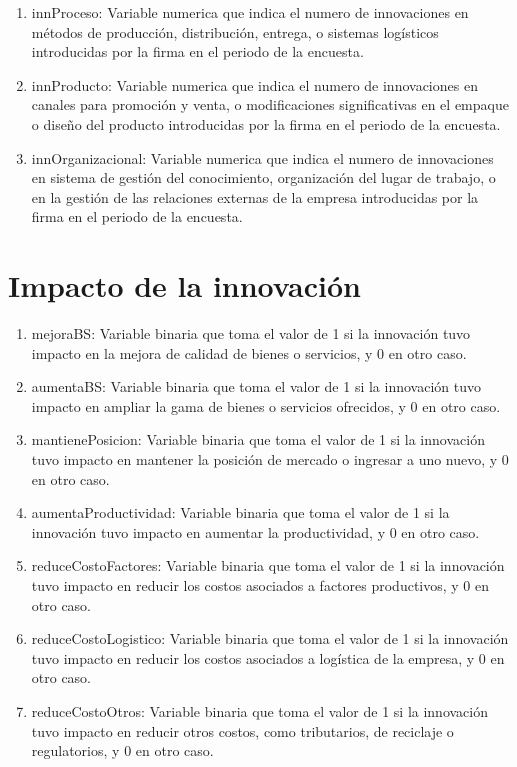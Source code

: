 \documentclass[12pt,a4paper]{article}
\begin{document}
\begin{enumerate}
	\item innProceso: Variable numerica que indica el numero de innovaciones en métodos de producción, distribución, entrega, o sistemas logísticos introducidas por la firma en el periodo de la encuesta.
	\item innProducto: Variable numerica que indica el numero de innovaciones en canales para promoción y venta, o modificaciones significativas en el empaque o diseño del producto introducidas por la firma en el periodo de la encuesta.
	\item innOrganizacional: Variable numerica que indica el numero de innovaciones en sistema de gestión del conocimiento, organización del lugar de trabajo, o en la gestión de las relaciones externas de la empresa introducidas por la firma en el periodo de la encuesta.
\end{enumerate}

\section{Impacto de la innovación}

\begin{enumerate}
	\item mejoraBS: Variable binaria que toma el valor de 1 si la innovación tuvo impacto en la mejora de calidad de bienes o servicios, y 0 en otro caso.
	\item aumentaBS: Variable binaria que toma el valor de 1 si la innovación tuvo impacto en ampliar la gama de bienes o servicios ofrecidos, y 0 en otro caso.
	\item mantienePosicion: Variable binaria que toma el valor de 1 si la innovación tuvo impacto en mantener la posición de mercado o ingresar a uno nuevo, y 0 en otro caso.
	\item aumentaProductividad: Variable binaria que toma el valor de 1 si la innovación tuvo impacto en aumentar la productividad, y 0 en otro caso.
	\item reduceCostoFactores: Variable binaria que toma el valor de 1 si la innovación tuvo impacto en reducir los costos asociados a factores productivos, y 0 en otro caso.
	\item reduceCostoLogistico: Variable binaria que toma el valor de 1 si la innovación tuvo impacto en reducir los costos asociados a logística de la empresa, y 0 en otro caso.
	\item reduceCostoOtros: Variable binaria que toma el valor de 1 si la innovación tuvo impacto en reducir otros costos, como tributarios, de reciclaje o regulatorios, y 0 en otro caso.
\end{enumerate}
\end{document}
